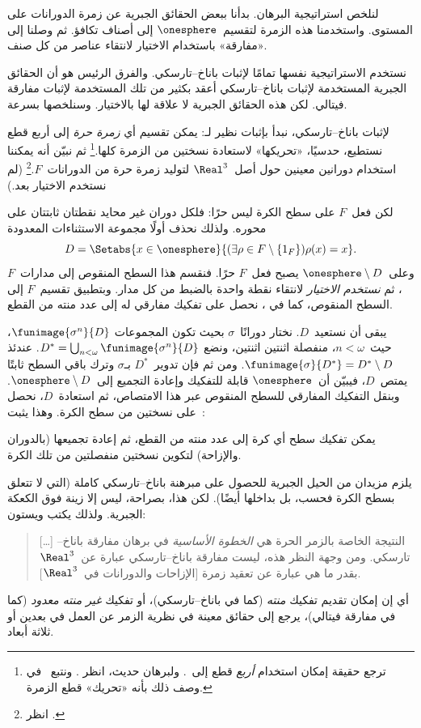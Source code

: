 \documentclass[../../../include/open-logic-section]{subfiles}
\begin{document}
لنلخص استراتيجية البرهان. بدأنا ببعض الحقائق الجبرية عن زمرة
الدورانات على المستوى. واستخدمنا هذه الزمرة لتقسيم~$\onesphere$ إلى
أصناف تكافؤ. ثم وصلنا إلى «مفارقة» باستخدام الاختيار لانتقاء عناصر
من كل صنف.

نستخدم الاستراتيجية نفسها تمامًا لإثبات باناخ--تارسكي. والفرق الرئيس
هو أن الحقائق الجبرية المستخدمة لإثبات باناخ--تارسكي أعقد بكثير من
تلك المستخدمة لإثبات مفارقة فيتالي. لكن هذه الحقائق الجبرية لا علاقة
لها بالاختيار. وسنلخصها بسرعة.

لإثبات باناخ--تارسكي، نبدأ بإثبات نظير لـ: يمكن
تقسيم أي \emph{زمرة حرة} إلى أربع قطع نستطيع، حدسيًا، «تحريكها»
لاستعادة نسختين من الزمرة كلها.\footnote{ترجع حقيقة إمكان استخدام
\emph{أربع} قطع إلى~\cite{Robinson1947}. ولبرهان حديث، انظر
\citet[Theorem 5.2]{Wagon2016}. ونتبع~\citet[p.~3]{Weston2003} في
وصف ذلك بأنه «تحريك» قطع الزمرة.} ثم نبيّن أنه يمكننا استخدام دورانين
معينين حول أصل~$\Real^3$ لتوليد زمرة حرة من الدورانات~$F$.\footnote{انظر
\citet[Theorem 2.1]{Wagon2016}.} (لم نستخدم الاختيار بعد.)

لكن فعل~$F$ على سطح الكرة ليس حرًا: فلكل دوران غير محايد نقطتان
ثابتتان على محوره. ولذلك نحذف أولًا مجموعة الاستثناءات المعدودة
\[
	D = \Setabs{x \in \onesphere}{(\exists \rho \in F \setminus \{1_F\})\rho(x)=x}.
\]
وعلى~$\onesphere \setminus D$ يصبح فعل~$F$ حرًا. فنقسم هذا السطح
المنقوص إلى مدارات~$F$، ثم \emph{نستخدم الاختيار} لانتقاء نقطة واحدة
بالضبط من كل مدار. وبتطبيق تقسيم~$F$ إلى السطح المنقوص، كما في
، نحصل على تفكيك مفارقي له إلى عدد منته من
القطع.

يبقى أن نستعيد~$D$. نختار دورانًا~$\sigma$ بحيث تكون المجموعات
$\funimage{\sigma^n}{D}$، حيث~$n < \omega$، منفصلة اثنتين اثنتين،
ونضع
$D^* = \bigcup_{n < \omega}\funimage{\sigma^n}{D}$. عندئذ
$\funimage{\sigma}{D^*} = D^* \setminus D$. ومن ثم فإن تدوير~$D^*$
بـ$\sigma$ وترك باقي السطح ثابتًا يمتص~$D$، فيبيّن أن~$\onesphere$
قابلة للتفكيك وإعادة التجميع إلى~$\onesphere \setminus D$. وبنقل
التفكيك المفارقي للسطح المنقوص عبر هذا الامتصاص، ثم استعادة~$D$،
نحصل على نسختين من سطح الكرة. وهذا يثبت~\citep{Hausdorff1914}:

\begin{thm}
يمكن تفكيك سطح أي كرة إلى عدد منته من القطع، ثم إعادة تجميعها
(بالدوران والإزاحة) لتكوين نسختين منفصلتين من تلك الكرة.
\end{thm}

يلزم مزيدان من الحيل الجبرية للحصول على مبرهنة باناخ--تارسكي كاملة
(التي لا تتعلق بسطح الكرة فحسب، بل بداخلها أيضًا). لكن هذا، بصراحة،
ليس إلا زينة فوق الكعكة الجبرية. ولذلك يكتب ويستون:
\begin{quote}	
  [\ldots] النتيجة الخاصة بالزمر الحرة هي \emph{الخطوة الأساسية} في
  برهان مفارقة باناخ--تارسكي. ومن وجهة النظر هذه، ليست مفارقة
  باناخ--تارسكي عبارة عن~$\Real^3$ بقدر ما هي عبارة عن تعقيد زمرة
  [الإزاحات والدورانات في~$\Real^3$]. \cite[p.~16]{Weston2003}
\end{quote}
أي إن إمكان تقديم تفكيك \emph{منته} (كما في باناخ--تارسكي)، أو تفكيك
\emph{غير منته معدود} (كما في مفارقة فيتالي)، يرجع إلى حقائق معينة
في نظرية الزمر عن العمل في بعدين أو ثلاثة أبعاد.
\end{document}

